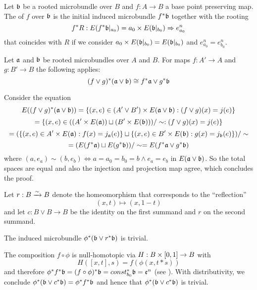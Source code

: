 \begin{mydefinition}
    Let $\mathfrak{b}$ be a rooted microbundle over $B$ and $f: A \to B$ a base point preserving map.
    The  of $f$ over $\mathfrak{b}$ is the initial induced microbundle $f^*\mathfrak{b}$ together with the rooting
    \[ f^*R: E(f^*\mathfrak{b}\vert_{a_0}) = a_0 \times E(\mathfrak{b}\vert_{b_0}) \Rightarrow{} e^n_{a_0} \]
    that coincides with $R$ if we consider $a_0 \times E(\mathfrak{b}\vert_{b_0}) = E(\mathfrak{b}\vert_{b_0})$ and $e^n_{a_0} = e^n_{b_0}$.
\end{mydefinition}

\begin{mylemma}\label{suspension::distributivity}%
    Let $\mathfrak{a}$ and $\mathfrak{b}$ be rooted microbundles over $A$ and $B$.
    For maps $f: A' \to A$ and $g: B' \to B$ the following applies:
    \[ (f \vee g)^*(\mathfrak{a} \vee \mathfrak{b}) \cong f^*\mathfrak{a} \vee g^*\mathfrak{b} \]
\end{mylemma}
\begin{myproof}
    Consider the equation
    \[ E((f \vee g)^*(\mathfrak{a} \vee \mathfrak{b})) = \{(x, e) \in (A' \vee B') \times E(\mathfrak{a} \vee \mathfrak{b}):(f \vee g)(x) = j(e)\} \]
    \[ = \{(x, e) \in ((A' \times E(\mathfrak{a})) \sqcup (B' \times E(\mathfrak{b}))) / \sim:(f \vee g)(x) = j(e)\} \]
    \[ = (\{(x, e) \in A' \times E(\mathfrak{a}):f(x) = j_{\mathfrak{a}}(e)\} \sqcup \{(x, e) \in B' \times E(\mathfrak{b}):g(x) = j_{\mathfrak{b}}(e)\}) / \sim \]
    \[ = (E(f^*\mathfrak{a}) \sqcup E(g^*\mathfrak{b})) / \sim = E(f^*\mathfrak{a} \vee g^*\mathfrak{b})\]
    where $(a, e_a) \sim (b, e_b) \iff a = a_0 = b_0 = b \land e_a = e_b$ in $E(\mathfrak{a} \vee \mathfrak{b})$.
    So the total spaces are equal and also the injection and projection map agree, which concludes the proof.
\end{myproof}

\begin{myparagraph}
    Let $r: B \xrightarrow{\sim} B$ denote the homeomorphism that corresponds to the ``reflection''
    \[ (x, t) \mapsto (x, 1 - t)\]
    and let $c: B \vee B \to B$ be the identity on the first summand and $r$ on the second summand.
\end{myparagraph}
\begin{mylemma}\label{suspension::reflection}
    The induced microbundle $\phi^*(\mathfrak{b} \vee r^*\mathfrak{b})$ is trivial.
\end{mylemma}
\begin{myproof}
    The composition $f \circ \phi$ is null-homotopic via $H: B \times [0, 1] \to B$ with
    \[ H([x, t], s) = f(\phi(x, t * s)) \]
    and therefore $\phi^*f^*\mathfrak{b} = (f \circ \phi)^*\mathfrak{b} = const_{b_0}^*\mathfrak{b} = \mathfrak{e}^{n}$ (see ).
    With distributivity, we conclude $\phi^*(\mathfrak{b} \vee c^*\mathfrak{b}) = \phi^*f^*\mathfrak{b}$ and hence that $\phi^*(\mathfrak{b} \vee c^*\mathfrak{b})$ is trivial.
\end{myproof}

